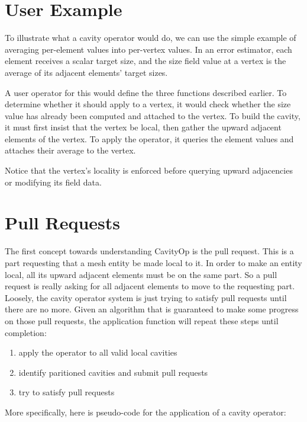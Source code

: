 \documentclass{article}
\begin{document}
\section{User Example}

To illustrate what a cavity operator would do, we can use the simple
example of averaging per-element values into per-vertex values.
In an error estimator, each element receives a scalar target size,
and the size field value at a vertex is the average of its adjacent
elements' target sizes.

A user operator for this would define the three functions described
earlier.
To determine whether it should apply to a vertex, it would check
whether the size value has already been computed and attached to the vertex.
To build the cavity, it must first insist that the vertex be local,
then gather the upward adjacent elements of the vertex.
To apply the operator, it queries the element values and attaches
their average to the vertex.

Notice that the vertex's locality is enforced before querying upward
adjacencies or modifying its field data.

\section{Pull Requests}

The first concept towards understanding CavityOp is the pull request.
This is a part requesting that a mesh entity be made local to it.
In order to make an entity local, all its upward adjacent elements
must be on the same part.
So a pull request is really asking for all adjacent elements to
move to the requesting part.
Loosely, the cavity operator system is just trying to satisfy pull requests
until there are no more.
Given an algorithm that is guaranteed to make some progress on those pull requests,
the application function will repeat these steps until completion:
\begin{enumerate}
\item apply the operator to all valid local cavities
\item identify paritioned cavities and submit pull requests
\item try to satisfy pull requests
\end{enumerate}
More specifically, here is pseudo-code for the application of a cavity operator:
\end{document}
